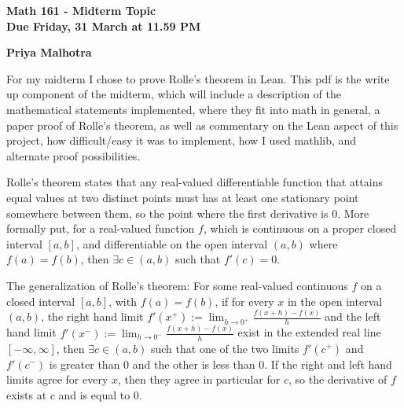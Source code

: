 \documentclass[12pt]{article}
\begin{document}
\textbf{Math 161 - Midterm Topic} \\
\textbf{Due Friday, 31 March at 11.59 PM}

\begin{comment}
Notes on Midterm Project Write-up:
    - The write-up should include a description of the mathematical 
    statements you implement, and where they fit into mathematics in 
    general.  You should also include a paper proof of the result you 
    implemented.  Then, you should comment on which parts of the 
    implementation were hard and/or easy, how you interacted with 
    the mathematics library (mathlib), and whether you could imagine 
    different proofs and how those different proofs might be implemented 
    (or be hard to implement).  
    - In general, the write up should be something that a peer in the 
    class could read and understand, and it should give the peer a good 
    sense of how they might implement something similar in Lean.
    - Also, the write-up should be 2-4 pages in length and should be 
    included as a pdf in your git repository folder where you are keeping 
    files for your midterm project.
\end{comment}

\textbf{Priya Malhotra}

For my midterm I chose to prove Rolle's theorem in Lean. This pdf is the write up component of the midterm, which will include a description of the mathematical statements implemented, where they fit into math in general, a paper proof of Rolle's theorem, as well as commentary on the Lean aspect of this project, how difficult/easy it was to implement, how I used mathlib, and alternate proof possibilities. 

Rolle's theorem states that any real-valued differentiable function that attains equal values at two distinct points must has at least one stationary point somewhere between them, so the point where the first derivative is 0. More formally put, for a real-valued function $f$, which is continuous on a proper closed interval $[a,b]$, and differentiable on the open interval $(a,b)$ where $f(a) = f(b)$, then $\exists c \in (a,b)$ such that $f'(c) = 0$. 

The generalization of Rolle's theorem: For some real-valued continuous $f$ on a closed interval $[a,b]$, with $f(a) = f(b)$, if for every $x$ in the open interval $(a,b)$, the right hand limit $f'(x^+) := \lim_{h \rightarrow 0^+} \frac{f(x+h) - f(x)}{h}$ and the left hand limit $f'(x^-) := \lim_{h \rightarrow 0^-} \frac{f(x+h) - f(x)}{h}$ exist in the extended real line $[-\infty, \infty]$, then $\exists c \in (a,b)$ such that one of the two limits $f'(c^+)$ and $f'(c^-)$ is greater than 0 and the other is less than 0. If the right and left hand limits agree for every $x$, then they agree in particular for $c$, so the derivative of $f$ exists at $c$ and is equal to 0. 
\end{document}
